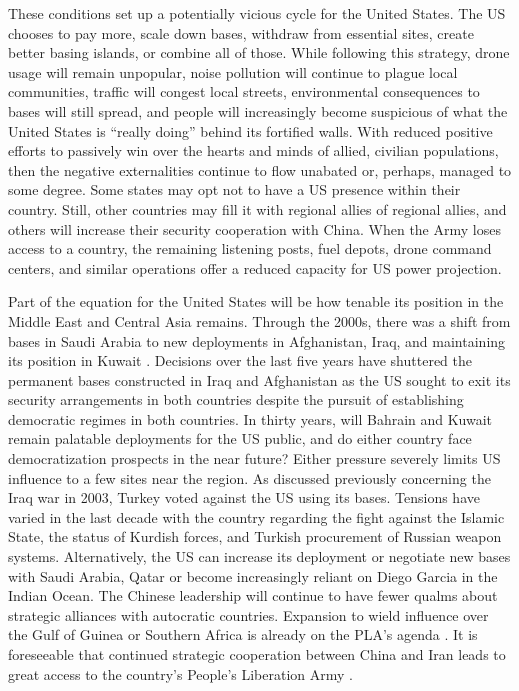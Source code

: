These conditions set up a potentially vicious cycle for the United States. The US chooses to pay more, scale down bases, withdraw from essential sites, create better basing islands, or combine all of those. While following this strategy, drone usage will remain unpopular, noise pollution will continue to plague local communities, traffic will congest local streets, environmental consequences to bases will still spread, and people will increasingly become suspicious of what the United States is ``really doing'' behind its fortified walls. With reduced positive efforts to passively win over the hearts and minds of allied, civilian populations, then the negative externalities continue to flow unabated or, perhaps, managed to some degree. Some states may opt not to have a US presence within their country. Still, other countries may fill it with regional allies of regional allies, and others will increase their security cooperation with China. When the Army loses access to a country, the remaining listening posts, fuel depots, drone command centers, and similar operations offer a reduced capacity for US power projection. %

Part of the equation for the United States will be how tenable its position in the Middle East and Central Asia remains. Through the 2000s, there was a shift from bases in Saudi Arabia to new deployments in Afghanistan, Iraq, and maintaining its position in Kuwait \cite{Engelhardt2009}. Decisions over the last five years have shuttered the permanent bases constructed in Iraq and Afghanistan as the US sought to exit its security arrangements in both countries despite the pursuit of establishing democratic regimes in both countries. In thirty years, will Bahrain and Kuwait remain palatable deployments for the US public, and do either country face democratization prospects in the near future? Either pressure severely limits US influence to a few sites near the region. As discussed previously concerning the Iraq war in 2003, Turkey voted against the US using its bases. Tensions have varied in the last decade with the country regarding the fight against the Islamic State, the status of Kurdish forces, and Turkish procurement of Russian weapon systems. Alternatively, the US can increase its deployment or negotiate new bases with Saudi Arabia, Qatar or become increasingly reliant on Diego Garcia in the Indian Ocean. The Chinese leadership will continue to have fewer qualms about strategic alliances with autocratic countries. Expansion to wield influence over the Gulf of Guinea or Southern Africa is already on the PLA's agenda \cite{cabestan2020}. It is foreseeable that continued strategic cooperation between China and Iran leads to great access to the country's People's Liberation Army \cite{Cordesman2021}. 

